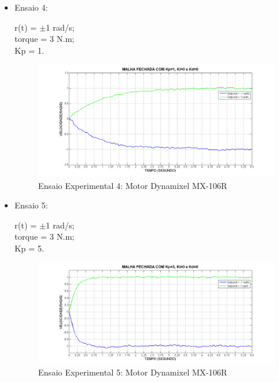 \documentclass[12pt,oneside,a4paper, chapter=TITLE, section = TITLE, english, brazil]{abntex2}
\begin{document}
\begin{itemize}
\item Ensaio 4:
 
r(t) = $\pm$1 rad/s;\\
torque = 3 N.m;\\
Kp = 1.\\

\begin{figure}[h] %
\centering
\includegraphics[scale=0.47]{./imagens/Ensaio4}
\caption[Ensaio Experimental 4: Motor Dynamixel MX-106R]{Ensaio Experimental 4: Motor Dynamixel MX-106R}
\label{fig:ensaio4}

\end{figure}

\item Ensaio 5:
 
r(t) = $\pm$1 rad/s;\\
torque = 3 N.m;\\
Kp = 5.

\begin{figure}[h] %
\centering
\includegraphics[scale=0.46]{./imagens/Ensaio5}
\caption[Ensaio Experimental 5: Motor Dynamixel MX-106R]{Ensaio Experimental 5: Motor Dynamixel MX-106R}
\label{fig:ensaio5}
\end{figure}

\end{itemize}
\end{document}

